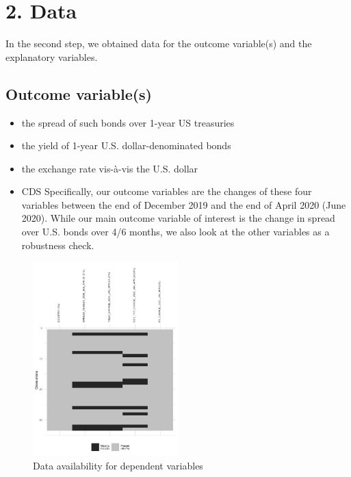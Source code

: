 \documentclass[11pt,]{article}
\providecommand{\tightlist}{%
\setlength{\itemsep}{0pt}\setlength{\parskip}{0pt}}
\begin{document}
\hypertarget{data}{%
\section{2. Data}\label{data}}

In the second step, we obtained data for the outcome variable(s) and the
explanatory variables.

\hypertarget{outcome-variables}{%
\subsection{Outcome variable(s)}\label{outcome-variables}}

\begin{itemize}
\tightlist
\item
  the spread of such bonds over 1-year US treasuries
\item
  the yield of 1-year U.S. dollar-denominated bonds
\item
  the exchange rate vis-à-vis the U.S. dollar
\item
  CDS Specifically, our outcome variables are the changes of these four
  variables between the end of December 2019 and the end of April 2020
  (June 2020). While our main outcome variable of interest is the change
  in spread over U.S. bonds over 4/6 months, we also look at the other
  variables as a robustness check.
\end{itemize}

\begin{figure}
\centering
\includegraphics[width=0.5\textwidth,height=\textheight]{reportfigures/missingdata_dependentvariable.png}
\caption{Data availability for dependent variables}
\end{figure}
\end{document}
